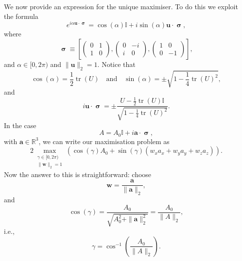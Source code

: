\documentclass[12pt]{amsart}
\DeclareMathOperator{\paulivec}{\boldsymbol{\sigma}}
\newcommand{\tr}{\operatorname{tr}}
\theoremstyle{definition}
\theoremstyle{remark}
\numberwithin{equation}{section}
\begin{document}
We now provide an expression for the unique maximiser. To do this we exploit the formula
\begin{equation}\label{eq:mat_param_exp}
	e^{i\alpha \mathbf{u}\cdot \paulivec} = \cos(\alpha)\mathbb{I} + i\sin(\alpha) \mathbf{u}\cdot \paulivec,
\end{equation} 
where 
\begin{equation}
	\paulivec \equiv \left[ \left(\begin{smallmatrix} 0 & 1 \\ 1 & 0\end{smallmatrix}\right),\left(\begin{smallmatrix} 0 & -i \\ i & 0\end{smallmatrix}\right), \left(\begin{smallmatrix} 1 & 0 \\ 0 & -1\end{smallmatrix}\right) \right],
\end{equation}
and $\alpha\in [0,2\pi)$ and $\|\mathbf{u}\|_2 = 1$. Notice that 
\begin{equation}
	\cos(\alpha) = \frac12\tr(U) \quad \text{and} \quad \sin(\alpha) = \pm\sqrt{1-\frac14\tr(U)^2},
\end{equation} 
and 
\begin{equation}
	i \mathbf{u}\cdot \paulivec = \pm\frac{U-\frac12\tr(U)\mathbb{I}}{\sqrt{1-\frac14\tr(U)^2}}.
\end{equation} 
	In the case
\begin{equation}
	A = A_0\mathbb{I} + i\mathbf{a}\cdot \paulivec,
\end{equation}
with $\mathbf{a}\in \mathbb{R}^3$, we can write our maximisation problem as
\begin{equation}
	2\max_{\substack{\gamma\in[0,2\pi)\\ \|\mathbf{w}\|_2=1}} \left(\cos(\gamma) A_0 + \sin(\gamma)(w_x a_x + w_y a_y+ w_z a_z)\right).
\end{equation}
Now the answer to this is straightforward: choose 
\begin{equation}
	\mathbf{w} = \frac{\mathbf{a}}{\|\mathbf{a}\|_2},
\end{equation}
and
\begin{equation}
	\cos(\gamma) = \frac{A_0}{\sqrt{A_0^2 + \|\mathbf{a}\|_2^2}} = \frac{A_0}{\|A\|_2},
\end{equation}
i.e.,
\begin{equation}
	\gamma = \cos^{-1}\left(\frac{A_0}{\|A\|_2}\right).
\end{equation}
\end{document}
